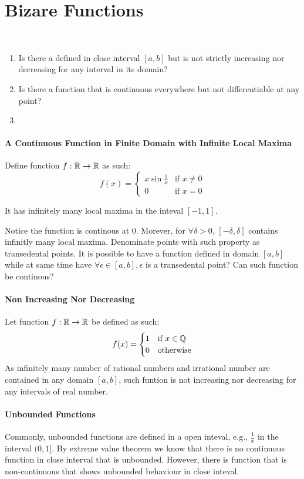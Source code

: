 \documentclass[../note.tex]{subfiles}
\begin{document}
\section{Bizare Functions}
\begin{hypothesis}
	\ 
\begin{enumerate}
	\item Is there a defined in close interval $[a,b]$ but is not strictly increasing nor decreasing for any interval in its domain? 
	\item Is there a function that is continuous everywhere but not differentiable at any point?
	\item  
\end{enumerate}
\end{hypothesis}
\paragraph{A Continuous Function in Finite Domain with Infinite Local Maxima} \label{InfiniteLocalMaxima}
Define function $f:\mathbb{R}\rightarrow \mathbb{R}$ as such:
\[
	f(x)=
	\begin{cases}
		x\sin{\frac{1}{x}} & \text{if } x\neq 0\\
		0 & \text{if } x = 0
	\end{cases}
\]

It has infinitely many local maxima in the inteval $[-1,1]$.

Notice the function is continous at $0$. Morever, for $\forall \delta > 0$, $[-\delta, \delta]$ contains infinitly many local maxima. Denominate points with such property as transedental points. It is possible to have a function defined in domain $[a,b]$ while at same time have $\forall \epsilon \in [a,b], \epsilon$ is a transedental point? Can such function be continous? 
\paragraph{Non Increasing Nor Decreasing}
Let function $f: \mathbb{R}\rightarrow \mathbb{R}$ be defined as such:
\[
	f(x)=
	\begin{cases}
		1 &\text{if } x \in \mathbb{Q}\\
		0 &\text{otherwise}
	\end{cases}
\]
As infinitely many number of rational numbers and irrational number are contained in any domain $[a,b]$, such funtion is not increasing nor decreasing for any intervals of real number.

\paragraph{Unbounded Functions}
Commonly, unbounded functions are defined in a open inteval, e.g., $\frac{1}{x}$ in the interval $(0, 1]$. By extreme value theorem we know that there is no continuous function in close interval that is unbounded. However, there is function that is non-continuous that shows unbounded behaviour in close inteval.
\end{document}

